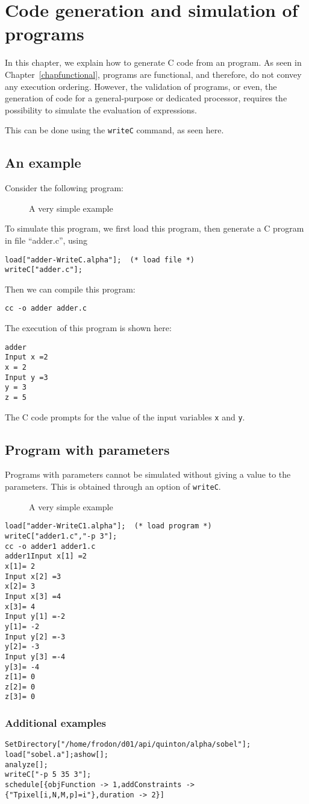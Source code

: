 \chapter{Code generation and simulation of {\alfa} programs}
\label{chapcodegen}
In this chapter, we explain how to generate C code from an
{\alfa} program. As seen in Chapter~\ref{chapfunctional}, 
{\alfa} programs are functional, and therefore, do not convey any
execution ordering. However, the validation of {\alfa} programs, 
or even, the generation of code for a general-purpose or
dedicated processor, requires the possibility to simulate the 
evaluation of {\alfa} expressions. 

This can be done using the {\tt writeC} {\mmalfa} command, as seen here.

\section*{An example}
Consider the following {\alfa} program:
\begin{figure}[htbp]

\caption{A very simple example\label{adderwritec}
}
\end{figure}
To simulate this program, we first load this program, 
then generate a C program in file ``adder.c'', using 
\begin{verbatim}
load["adder-WriteC.alpha"];  (* load file *)
writeC["adder.c"];
\end{verbatim}
Then we can compile this program: 
\begin{verbatim}
cc -o adder adder.c
\end{verbatim}
The execution of this program is shown here:
\begin{verbatim}
adder
Input x =2
x = 2
Input y =3
y = 3
z = 5
\end{verbatim}
The C code prompts for the value of the input variables {\tt x} and
{\tt y}.
\section{Program with parameters}
Programs with parameters cannot be simulated without giving 
a value to the parameters. This is obtained through an option of
{\tt writeC}. 
\begin{figure}[htbp]

\caption{A very simple example\label{adderwritec1}
}
\end{figure}
\begin{verbatim}
load["adder-WriteC1.alpha"];  (* load program *)
writeC["adder1.c","-p 3"];
cc -o adder1 adder1.c
adder1Input x[1] =2
x[1]= 2
Input x[2] =3
x[2]= 3
Input x[3] =4
x[3]= 4
Input y[1] =-2
y[1]= -2
Input y[2] =-3
y[2]= -3
Input y[3] =-4
y[3]= -4
z[1]= 0
z[2]= 0
z[3]= 0
\end{verbatim}
\subsection{Additional examples}
\begin{verbatim}
SetDirectory["/home/frodon/d01/api/quinton/alpha/sobel"];
load["sobel.a"];ashow[];
analyze[];
writeC["-p 5 35 3"];
schedule[{objFunction -> 1,addConstraints -> {"Tpixel[i,N,M,p]=i"},duration -> 2}]
\end{verbatim}